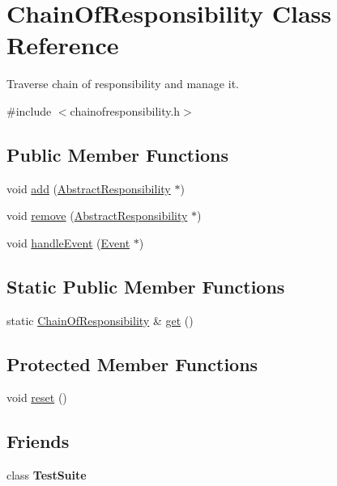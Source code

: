 \hypertarget{classChainOfResponsibility}{\section{Chain\-Of\-Responsibility Class Reference}
\label{classChainOfResponsibility}
}


Traverse chain of responsibility and manage it.  




{\ttfamily \#include $<$chainofresponsibility.\-h$>$}

\subsection*{Public Member Functions}
\begin{DoxyCompactItemize}
\item 
void \hyperlink{classChainOfResponsibility_a59e7c6850bbbef64d53043fc78ac8b8b}{add} (\hyperlink{classAbstractResponsibility}{Abstract\-Responsibility} $\ast$)
\item 
void \hyperlink{classChainOfResponsibility_ab452d547a94bb23a0417f81850ca0601}{remove} (\hyperlink{classAbstractResponsibility}{Abstract\-Responsibility} $\ast$)
\item 
void \hyperlink{classChainOfResponsibility_a068f5080af0681aadf0d1a9292b21988}{handle\-Event} (\hyperlink{classEvent}{Event} $\ast$)
\end{DoxyCompactItemize}
\subsection*{Static Public Member Functions}
\begin{DoxyCompactItemize}
\item 
static \hyperlink{classChainOfResponsibility}{Chain\-Of\-Responsibility} \& \hyperlink{classChainOfResponsibility_aeefa4eddd729640133be4c7bcc1a99c8}{get} ()
\end{DoxyCompactItemize}
\subsection*{Protected Member Functions}
\begin{DoxyCompactItemize}
\item 
void \hyperlink{classChainOfResponsibility_acb45d69622de806430f898d5a27145dc}{reset} ()
\end{DoxyCompactItemize}
\subsection*{Friends}
\begin{DoxyCompactItemize}
\item 
\hypertarget{classChainOfResponsibility_ab9aaba231fd11196425e75caf709bfc6}{class {\bfseries Test\-Suite}}\label{classChainOfResponsibility_ab9aaba231fd11196425e75caf709bfc6}

\end{DoxyCompactItemize}


